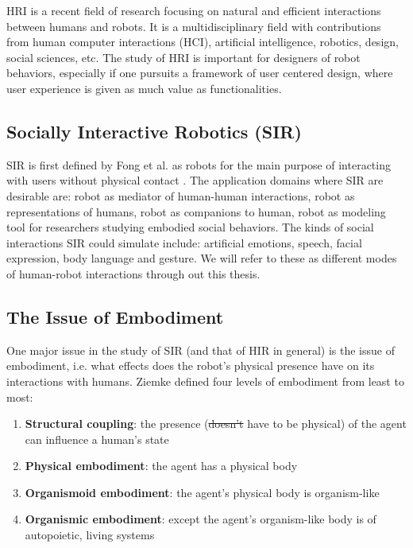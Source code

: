 \documentclass{ut-thesis}
\providecommand{\DIFaddtex}[1]{{\protect\color{blue}\uwave{#1}}} %
\providecommand{\DIFdeltex}[1]{{\protect\color{red}\sout{#1}}}                      %
\providecommand{\DIFaddbegin}{} %
\providecommand{\DIFaddend}{} %
\providecommand{\DIFdelbegin}{} %
\providecommand{\DIFdelend}{} %
\providecommand{\DIFadd}[1]{\texorpdfstring{\DIFaddtex{#1}}{#1}} %
\providecommand{\DIFdel}[1]{\texorpdfstring{\DIFdeltex{#1}}{}} %
\begin{document}
HRI is a recent field of research focusing on natural and efficient interactions between humans and robots.  It is a multidisciplinary field with contributions from human computer interactions (HCI), artificial intelligence, robotics, design, social sciences, etc.  The study of HRI is important for designers of robot behaviors, especially if one pursuits a framework of user centered design, where user experience is given as much value as functionalities. 


\subsection{Socially Interactive Robotics (SIR)}
SIR is first defined by Fong et al. as robots for the main purpose of interacting with users without physical contact \cite{fong2003survey}.  The application domains where SIR are desirable are: robot as mediator of human-human interactions, robot as representations of humans, robot as companions to human, robot as modeling tool for researchers studying embodied social behaviors.  The kinds of social interactions SIR could simulate include: artificial emotions, speech, facial expression, body language and gesture.  We will refer to these as different modes of human-robot interactions through out this thesis.


\subsection{The Issue of Embodiment}
One major issue in the study of SIR (and that of HIR in general) is the issue of embodiment, i.e. what effects does the robot's physical presence have on its interactions with humans.  Ziemke \cite{ziemke2001disentangling} defined four levels of embodiment from least to most:
\begin{enumerate}
	\item \textbf{Structural coupling}: the presence (\DIFdelbegin \DIFdel{doesn't }\DIFdelend \DIFaddbegin \DIFadd{does not }\DIFaddend have to be physical) of the agent can influence a human's state
	\item \textbf{Physical embodiment}: the agent has a physical body
	\item \textbf{Organismoid embodiment}: the agent's physical body is organism-like
	\item \textbf{Organismic embodiment}: except the agent's organism-like body is of autopoietic, living systems
\end{enumerate}
\end{document}
